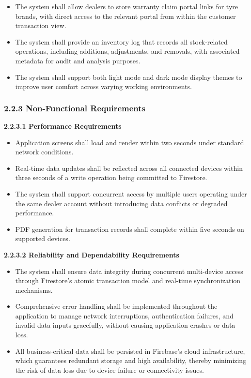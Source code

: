 \documentclass[12pt, oneside]{article}
\begin{document}
\begin{itemize}
    \item The system shall allow dealers to store warranty claim portal links for tyre brands, with direct access to the relevant portal from within the customer transaction view.
    \item The system shall provide an inventory log that records all stock-related operations, including additions, adjustments, and removals, with associated metadata for audit and analysis purposes.
    \item The system shall support both light mode and dark mode display themes to improve user comfort across varying working environments.
\end{itemize}

\vspace{0.5em}
\subsubsection*{2.2.3 Non-Functional Requirements}

\vspace{0.25em}
\textbf{2.2.3.1 Performance Requirements}
\begin{itemize}
    \item Application screens shall load and render within two seconds under standard network conditions.
    \item Real-time data updates shall be reflected across all connected devices within three seconds of a write operation being committed to Firestore.
    \item The system shall support concurrent access by multiple users operating under the same dealer account without introducing data conflicts or degraded performance.
    \item PDF generation for transaction records shall complete within five seconds on supported devices.
\end{itemize}

\vspace{0.25em}
\textbf{2.2.3.2 Reliability and Dependability Requirements}
\begin{itemize}
    \item The system shall ensure data integrity during concurrent multi-device access through Firestore's atomic transaction model and real-time synchronization mechanisms.
    \item Comprehensive error handling shall be implemented throughout the application to manage network interruptions, authentication failures, and invalid data inputs gracefully, without causing application crashes or data loss.
    \item All business-critical data shall be persisted in Firebase's cloud infrastructure, which guarantees redundant storage and high availability, thereby minimizing the risk of data loss due to device failure or connectivity issues.
\end{itemize}
\end{document}
